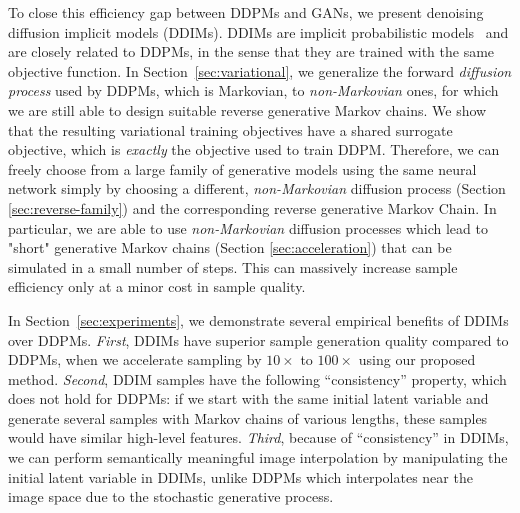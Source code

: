 To close this efficiency gap between DDPMs and GANs, %
we present denoising diffusion implicit models (DDIMs). DDIMs are implicit probabilistic models~\citep{mohamed2016learning} and are closely related to DDPMs, in the sense that they are trained with the same objective function. %
In Section~\ref{sec:variational}, 
we generalize the forward \textit{diffusion process} used by DDPMs, which is Markovian, to \textit{non-Markovian} ones, for which we are still able to design suitable reverse generative Markov chains.
We show that the resulting variational training objectives have a shared surrogate objective, which is \textit{exactly} the objective used to train DDPM. %
Therefore, we can freely choose from a large family of generative models using the same neural network simply by choosing a different, \textit{non-Markovian} diffusion process (Section \ref{sec:reverse-family}) and the corresponding reverse generative Markov Chain. 
In particular, we are able to use \textit{non-Markovian} diffusion processes which lead to "short" generative Markov chains (Section \ref{sec:acceleration}) that can be simulated in a small number of steps.
This can massively increase sample efficiency only at a minor cost in sample quality. 




In Section~\ref{sec:experiments}, we demonstrate several empirical benefits of DDIMs over DDPMs. \textit{First}, DDIMs have superior sample generation quality compared to DDPMs, when we accelerate sampling by $10\times$ to $100\times$ using our proposed method. 
\textit{Second}, DDIM samples have the following ``consistency'' property, which does not hold for DDPMs: if we start with the same initial latent variable and generate several samples with Markov chains of various lengths, these samples would have similar high-level features. %
\textit{Third}, because of ``consistency'' in DDIMs, %
we can perform semantically meaningful image interpolation by manipulating the initial latent variable in DDIMs, unlike DDPMs which interpolates near the image space due to the stochastic generative process.


